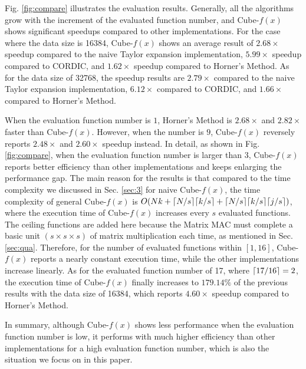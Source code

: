 \documentclass[12pt]{extbook}
\DeclarePairedDelimiter\ceil{\lceil}{\rceil}
\begin{document}
Fig. \ref{fig:compare} illustrates the evaluation results. Generally, all the algorithms grow with the increment of the evaluated function number, and Cube-$f(x)$ shows significant speedups compared to other implementations. For the case where the data size is 16384, Cube-$f(x)$ shows an average result of $2.68\times$ speedup compared to the naive Taylor expansion implementation, $5.99\times$ speedup compared to CORDIC, and $1.62\times$ speedup compared to Horner's Method. As for the data size of 32768, the speedup results are $2.79\times$ compared to the naive Taylor expansion implementation, $6.12\times$ compared to CORDIC, and $1.66\times$ compared to Horner's Method. 

When the evaluation function number is $1$, Horner's Method is $2.68\times$ and $2.82\times$ faster than Cube-$f(x)$. However, when the number is $9$, Cube-$f(x)$ reversely reports $2.48\times$ and $2.60\times$ speedup instead. In detail, as shown in Fig. \ref{fig:compare}, when the evaluation function number is larger than 3, Cube-$f(x)$ reports better efficiency than other implementations and keeps enlarging the performance gap. The main reason for the results is that compared to the time complexity we discussed in Sec. \ref{sec:3} for naive Cube-$f(x)$, the time complexity of general Cube-$f(x)$ is $O(Nk + \ceil{N / s} \ceil{k / s} + \ceil{N / s} \ceil{k / s} \ceil{j / s})$, where the execution time of Cube-$f(x)$ increases every $s$ evaluated functions. The ceiling functions are added here because the Matrix MAC must complete a basic unit $(s \times s \times s)$ of matrix multiplication each time, as mentioned in Sec. \ref{sec:qua}. Therefore, for the number of evaluated functions within $[1, 16]$, Cube-$f(x)$ reports a nearly constant execution time, while the other implementations increase linearly. As for the evaluated function number of 17, where $\ceil{17 / 16} = 2$, the execution time of Cube-$f(x)$ finally increases to $179.14\%$ of the previous results with the data size of 16384, which reports $4.60\times$ speedup compared to Horner's Method. 

In summary, although Cube-$f(x)$ shows less performance when the evaluation function number is low, it performs with much higher efficiency than other implementations for a high evaluation function number, which is also the situation we focus on in this paper.
\end{document}
